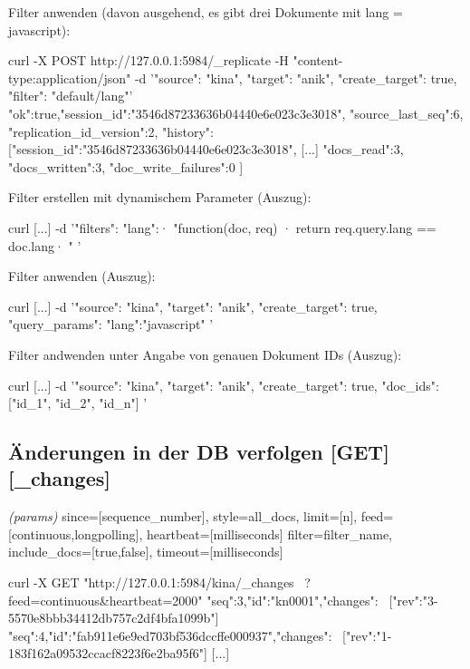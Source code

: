 \documentclass[19pt,landscape,twocolumn]{article}
\newcommand{\htmlverb}[1]{{[}\textbf{{#1}}{]}}
\newcommand{\brackets}[1]{{[}{#1}{]}}
\begin{document}
Filter anwenden (davon ausgehend, es gibt drei Dokumente mit lang = javascript):

\begin{code}
curl -X POST http://127.0.0.1:5984/_replicate
     -H "content-type:application/json"
     -d '{"source": "kina",
          "target": "anik",
          "create_target": true,
          "filter": "default/lang"}'
{"ok":true,"session_id":"3546d87233636b04440e6e023c3e3018",
 "source_last_seq":6,
 "replication_id_version":2, "history":
  [{"session_id":"3546d87233636b04440e6e023c3e3018",
    [...]
    "docs_read":3,
    "docs_written":3,
    "doc_write_failures":0
  }]
}
\end{code}

Filter erstellen mit dynamischem Parameter (Auszug):

\begin{code}
curl [...]
  -d '{"filters":{
       "lang":·
         "function(doc, req) {·
           return req.query.lang == doc.lang·
         }"
       }
    }'
\end{code}

Filter anwenden (Auszug):

\begin{code}
curl [...]
  -d '{"source": "kina",
       "target": "anik",
       "create_target": true,
       "query_params": {
          "lang":"javascript"
       }
     }'
\end{code}

Filter andwenden unter Angabe von genauen Dokument IDs (Auszug):

\begin{code}
curl [...]
  -d '{"source": "kina",
       "target": "anik",
       "create_target": true,
       "doc_ids": ["id_1", "id_2", "id_n"]
     }'
\end{code}

\subsection{Änderungen in der DB verfolgen \htmlverb{GET} \htmlverb{\_changes}}
\emph{(params)} since=\brackets{sequence\_number}, style=all\_docs, limit=\brackets{n}, \newline
feed=\brackets{continuous,longpolling}, heartbeat=\brackets{milliseconds} \newline
filter=filter\_name, include\_docs=\brackets{true,false}, timeout=\brackets{milliseconds}

\begin{code}
curl -X GET "http://127.0.0.1:5984/kina/_changes \
  ?feed=continuous&heartbeat=2000"
{"seq":3,"id":"kn0001","changes": \
  [{"rev":"3-5570e8bbb34412db757c2df4bfa1099b"}]}
{"seq":4,"id":"fab911e6e9ed703bf536dccffe000937","changes": \ 
  [{"rev":"1-183f162a09532ccacf8223f6e2ba95f6"}]}
[...]
\end{code}
\end{document}

